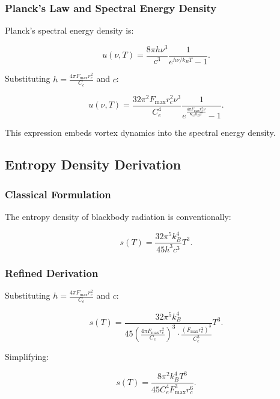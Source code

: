   \subsubsection*{Planck's Law and Spectral Energy Density}
  Planck's spectral energy density is:

  \begin{equation*}
   u(\nu, T) = \frac{8 \pi h \nu^3}{c^3} \frac{1}{e^{h \nu / k_B T} - 1}.
  \end{equation*}

  Substituting $h = \frac{4 \pi F_{\max} r_c^2}{C_e}$ and $c$:

  \begin{equation*}
   u(\nu, T) = \frac{32 \pi^2 F_{\max} r_c^2 \nu^3}{C_e^4} \frac{1}{e^{\frac{4 \pi F_{\max} r_c^2 \nu}{\mathbf{v}_{\scriptscriptstyle\boldsymbol{\circlearrowleft}} k_B T}} - 1}.
  \end{equation*}

  This expression embeds vortex dynamics into the spectral energy density.

  \subsection*{Entropy Density Derivation}

  \subsubsection*{Classical Formulation}
  The entropy density of blackbody radiation is conventionally:

  \begin{equation*}
   s(T) = \frac{32 \pi^5 k_B^4}{45 h^3 c^3} T^3.
  \end{equation*}

  \subsubsection*{Refined Derivation}
  Substituting $h = \frac{4 \pi F_{\max} r_c^2}{C_e}$ and $c$:

  \begin{equation*}
   s(T) = \frac{32 \pi^5 k_B^4}{45 \left(\frac{4 \pi F_{\max} r_c^2}{C_e}\right)^3 \cdot \frac{(F_{\max} r_c^2)^3}{C_e^3}} T^3.
  \end{equation*}

  Simplifying:

  \begin{equation*}
   s(T) = \frac{8 \pi^2 k_B^4 T^3}{45 C_e^4 F_{\max}^3 r_c^6}.
  \end{equation*}

